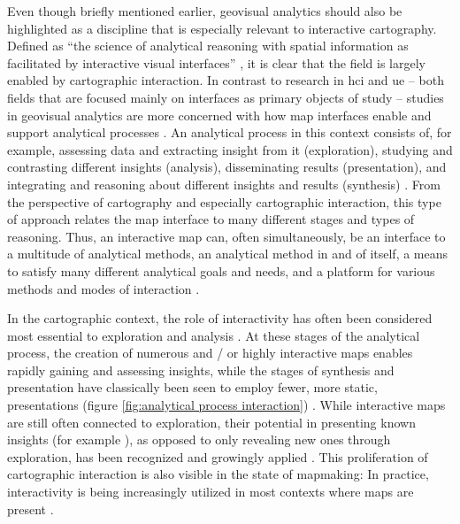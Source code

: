 Even though briefly mentioned earlier,
geovisual analytics should also be highlighted as
a discipline that is especially relevant to interactive cartography.
Defined as \enquote{the science of analytical reasoning with
spatial information as facilitated by interactive visual interfaces}
\parencite{rob2017b},
it is clear that the field is largely enabled by
cartographic interaction.
In contrast to research in \acrshort{hci} and \acrshort{ue} --
both fields that are focused mainly on interfaces as primary objects of study
\parencite{mol2023, car1997} --
studies in geovisual analytics are more concerned with
how map interfaces enable and support analytical processes \parencite{rob2017b, and2010}.
An analytical process in this context consists of, for example,
assessing data and extracting insight from it (exploration),
studying and contrasting different insights (analysis),
disseminating results (presentation),
and integrating and reasoning about different insights and results (synthesis) \parencite{mac2017, dib1990}.
From the perspective of cartography and especially cartographic interaction,
this type of approach relates the map interface to many different stages and types of reasoning.
Thus, an interactive map can, often simultaneously, be
an interface to a multitude of analytical methods,
an analytical method in and of itself,
a means to satisfy many different analytical goals and needs,
and a platform for various methods and modes of interaction \parencite{rot2013b, rot2015}.

In the cartographic context,
the role of interactivity has often been considered most essential to
exploration and analysis \parencite{eds2008}.
At these stages of the analytical process,
the creation of numerous and / or highly interactive maps
enables rapidly gaining and assessing insights,
while the stages of synthesis and presentation
have classically been seen to employ fewer,
more static, presentations
(figure \ref{fig:analytical process interaction}) \parencite{dib1990}.
While interactive maps are still often connected to exploration,
their potential in presenting known insights (for example \textcite{ecc2008}),
as opposed to only revealing new ones through exploration,
has been recognized and growingly applied \parencite{fis2021}.
This proliferation of cartographic interaction is also visible in the state of mapmaking:
In practice, interactivity is being increasingly utilized
in most contexts where maps are present \parencite{fis2021, mei2019, rot2015}.

